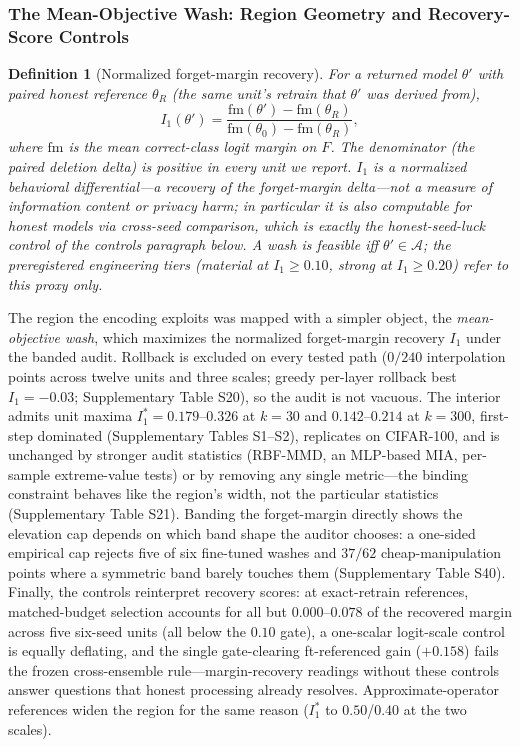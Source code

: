\documentclass[lettersize,journal]{IEEEtran}
\newtheorem{definition}{Definition}
\begin{document}
\subsubsection{The Mean-Objective Wash: Region Geometry and
Recovery-Score Controls}\label{sec:wash}
\begin{definition}[Normalized forget-margin recovery]\label{def:i1}
For a returned model $\theta'$ with paired honest reference
$\theta_R$ (the same unit's retrain that $\theta'$ was derived from),
\begin{equation}
\label{eq:i1}
I_1(\theta') = \frac{\mathrm{fm}(\theta') - \mathrm{fm}(\theta_R)}
{\mathrm{fm}(\theta_0) - \mathrm{fm}(\theta_R)},
\end{equation}
where
$\mathrm{fm}$ is the mean correct-class logit margin on $F$. The
denominator (the paired deletion delta) is positive in every unit we
report. $I_1$ is a normalized behavioral differential---a recovery of
the forget-margin delta---not a measure of information content or
privacy harm; in particular it is also computable for honest models
via cross-seed comparison, which is exactly the honest-seed-luck
control of the controls paragraph below. A wash is feasible iff
$\theta' \in \mathcal{A}$; the preregistered engineering tiers
(\emph{material} at $I_1 \ge 0.10$, \emph{strong} at $I_1 \ge 0.20$)
refer to this proxy only.
\end{definition}
The region the encoding exploits was mapped with a simpler
object, the \emph{mean-objective wash}, which maximizes the
normalized forget-margin recovery $I_1$ under the banded audit. Rollback is
excluded on every tested path ($0/240$ interpolation points
across twelve units and three scales; greedy per-layer
rollback best $I_1 = -0.03$; Supplementary Table S20), so the
audit is not vacuous. The interior admits unit maxima
$I_1^* = 0.179$--$0.326$ at $k{=}30$ and $0.142$--$0.214$ at
$k{=}300$, first-step dominated (Supplementary Tables S1--S2),
replicates on CIFAR-100, and is unchanged by stronger audit
statistics (RBF-MMD, an MLP-based MIA, per-sample
extreme-value tests) or by removing any single metric---the
binding constraint behaves like the region's width, not the
particular statistics (Supplementary Table S21). Banding the
forget-margin directly shows the elevation cap depends on
which band shape the auditor chooses: a one-sided empirical
cap rejects five of six fine-tuned washes and $37/62$
cheap-manipulation points where a symmetric band barely
touches them (Supplementary Table S40). Finally, the controls
reinterpret recovery scores: at exact-retrain references,
matched-budget selection accounts for all but
$0.000$--$0.078$ of the recovered margin across five six-seed
units (all below the $0.10$ gate), a one-scalar logit-scale
control is equally deflating, and the single gate-clearing
ft-referenced gain ($+0.158$) fails the frozen
cross-ensemble rule---margin-recovery readings without these
controls answer questions that honest processing already
resolves. Approximate-operator references widen the region
for the same reason ($I_1^*$ to $0.50$/$0.40$ at the two
scales).
\label{sec:fmband}\label{sec:selection-control}
\end{document}
